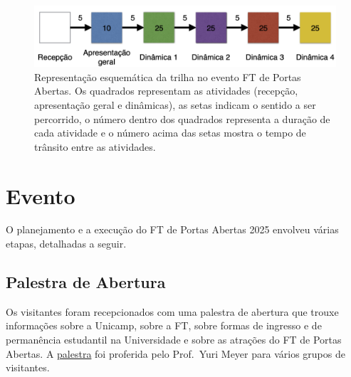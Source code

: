 \documentclass[
  letterpaper,
  DIV=11,
  numbers=noendperiod]{scrreprt}
\begin{document}
\begin{figure}[H]

{\centering \includegraphics[width=0.7\linewidth,height=\textheight,keepaspectratio]{atividades/dinamica.png}

}

\caption{Representação esquemática da trilha no evento FT de Portas
Abertas. Os quadrados representam as atividades (recepção, apresentação
geral e dinâmicas), as setas indicam o sentido a ser percorrido, o
número dentro dos quadrados representa a duração de cada atividade e o
número acima das setas mostra o tempo de trânsito entre as atividades.}

\end{figure}%


\chapter{Evento}\label{evento}

O planejamento e a execução do FT de Portas Abertas 2025 envolveu várias
etapas, detalhadas a seguir.

\section{Palestra de Abertura}\label{palestra-de-abertura}

Os visitantes foram recepcionados com uma palestra de abertura que
trouxe informações sobre a Unicamp, sobre a FT, sobre formas de ingresso
e de permanência estudantil na Universidade e sobre as atrações do FT de
Portas Abertas. A \href{FTPA-palestra-abertura.pdf}{palestra} foi
proferida pelo Prof.~Yuri Meyer para vários grupos de visitantes.
\end{document}
